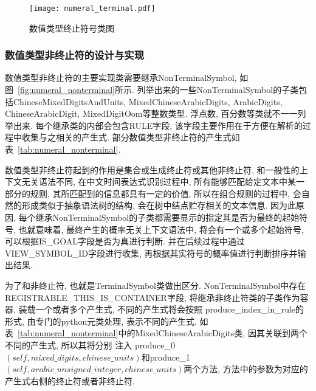 \begin{figure}[h]
    \centering
    \texttt{[image: numeral\_terminal.pdf]}
    \caption{数值类型终止符号类图}
    \label{fig:numeral_terminal}
\end{figure}


\subsubsection{数值类型非终止符的设计与实现}

数值类型非终止符的主要实现类需要继承NonTerminalSymbol, 如图~\ref{fig:numeral_nonterminal}所示.
列举出来的一些NonTerminalSymbol的子类包括ChineseMixedDigitsAndUnits, MixedChineseArabicDigits, ArabicDigits, ChineseArabicDigit, MixedDigitOom等整数类型.
浮点数, 百分数等类就不一一列举出来. 每个继承类的内部会包含RULE字段, 该字段主要作用在于方便在解析的过程中收集与之相关的产生式. 部分数值类型非终止符的产生式如表~\ref{tab:numeral_nonterminal}.

数值类型非终止符起到的作用是集合或生成终止符或其他非终止符, 和一般性的上下文无关语法不同, 在中文时间表达式识别过程中, 所有能够匹配给定文本中某一部分的规则,
其所匹配到的信息都具有一定的价值, 所以在组合规则的过程中, 会自然的形成类似于抽象语法树的结构, 会在树中结点贮存相关的文本信息.
因为此原因, 每个继承NonTerminalSymbol的子类都需要显示的指定其是否为最终的起始符号, 也就意味着, 最终产生的概率无关上下文语法中, 将会有一个或多个起始符号, 可以根据IS\_GOAL字段是否为真进行判断.
并在后续过程中通过VIEW\_SYMBOL\_ID字段进行收集, 再根据其实符号的概率值进行判断排序并输出结果.

为了和非终止符, 也就是TerminalSymbol类做出区分.
NonTerminalSymbol中存在REGISTRABLE\_THIS\_IS\_CONTAINER字段,
将继承非终止符类的子类作为容器, 装载一个或者多个产生式, 不同的产生式将会按照
produce\_index\_in\_rule的形式, 由专门的python元类处理, 表示不同的产生式. 如表~\ref{tab:numeral_nonterminal}中的MixedChineseArabicDigits类, 因其关联到两个不同的产生式, 所以其将分别
注入 produce\_0$\left(self, mixed\_digits, chinese\_units\right)$和produce\_1$\left(self, arabic\_unsigned\_integer, chinese\_units\right)$两个方法, 方法中的参数为对应的产生式右侧的终止符或者非终止符.


